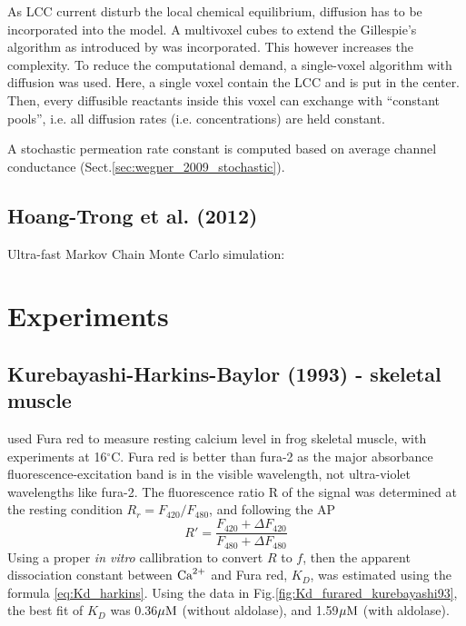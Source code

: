As LCC current disturb the local chemical equilibrium, diffusion has to be
incorporated into the model. A multivoxel cubes to extend the Gillespie's
algorithm as introduced by \citep{elf2003} was incorporated. This however
increases the complexity. To reduce the computational demand, a single-voxel
algorithm with diffusion was used. Here, a single voxel contain the LCC and
is put in the center. Then, every diffusible reactants inside this voxel can
exchange with ``constant pools'', i.e. all diffusion rates (i.e.
concentrations) are held constant.

A stochastic permeation rate constant is computed based on average channel
conductance (Sect.\ref{sec:wegner_2009_stochastic}).

\subsection{Hoang-Trong et al. (2012)} 

Ultra-fast Markov Chain Monte Carlo simulation: 

\section{Experiments}

\subsection{Kurebayashi-Harkins-Baylor (1993) - skeletal muscle}
\label{sec:kurebayashi1993}

\citep{kurebayashi1993} used Fura red to measure resting calcium level in frog
skeletal muscle, with experiments at 16$^\circ$C. Fura red is better than fura-2
as the major absorbance fluorescence-excitation band is in the visible
wavelength, not ultra-violet wavelengths like fura-2. The fluorescence ratio R
of the signal was determined at the resting condition $R_r=F_{420}/F_{480}$, and
following the AP
\begin{equation}
R'=\frac{F_{420}+\Delta F_{420}}{F_{480}+\Delta F_{480}}
\end{equation}
Using a proper {\it in vitro} callibration to convert $R$ to $f$, then the
apparent dissociation constant between ${\text{Ca}^{2+}}$ and Fura red, $K_D$, was estimated
using the formula \ref{eq:Kd_harkins}. Using the data in
Fig.\ref{fig:Kd_furared_kurebayashi93}, the best fit of $K_D$ was
0.36${\mu\text{M}}$ (without aldolase), and 1.59${\mu\text{M}}$ (with aldolase).


